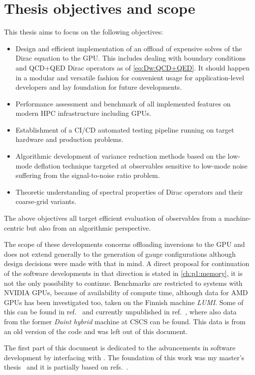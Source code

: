 \section{Thesis objectives and scope}
\label{sec:intro:objectives}

This thesis aims to focus on the following objectives:
\begin{itemize}
   \item Design and efficient implementation of an offload of expensive solves of the Dirac equation to the GPU. This includes dealing with \Cstar boundary conditions and QCD+QED Dirac operators as of \cref{eq:Dw:QCD+QED}. It should happen in a modular and versatile fashion for convenient usage for application-level developers and lay foundation for future developments.
   \item Performance assessment and benchmark of all implemented features on modern HPC infrastructure including GPUs.
   \item Establishment of a CI/CD automated testing pipeline running on target hardware and production problems.
   \item Algorithmic development of variance reduction methods based on the low-mode deflation technique targeted at observables sensitive to low-mode noise suffering from the signal-to-noise ratio problem.
   \item Theoretic understanding of spectral properties of Dirac operators and their coarse-grid variants.
\end{itemize}
The above objectives all target efficient evaluation of observables from a machine-centric but also from an algorithmic perspective.

The scope of these developments concerns offloading inversions to the GPU and does not extend generally to the generation of gauge configurations although design decisions were made with that in mind.
A direct proposal for continuation of the software developments in that direction is stated in \cref{ch:p1:memory}, it is not the only possibility to continue.
Benchmarks are restricted to systems with NVIDIA GPUs, because of availability of compute time, although data for AMD GPUs has been investigated too, taken on the Finnish machine \emph{LUMI}.
Some of this can be found in ref.~ and currently unpublished in ref.~, where also data from the former \emph{Daint hybrid} machine at CSCS can be found.
This data is from an old version of the code and was left out of this document.

The first part of this document is dedicated to the advancements in software development by interfacing \openqxd with \quda.
The foundation of this work was my master's thesis~ and it is partially based on refs.~.

